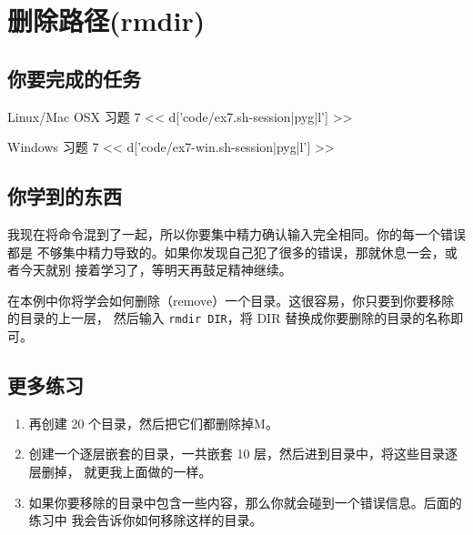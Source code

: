 \chapter{删除路径(rmdir)}

\section{你要完成的任务}

\begin{code}{Linux/Mac OSX 习题 7}
<< d['code/ex7.sh-session|pyg|l'] >>
\end{code}

\begin{code}{Windows 习题 7}
<< d['code/ex7-win.sh-session|pyg|l'] >>
\end{code}


\section{你学到的东西}

我现在将命令混到了一起，所以你要集中精力确认输入完全相同。你的每一个错误都是
不够集中精力导致的。如果你发现自己犯了很多的错误，那就休息一会，或者今天就别
接着学习了，等明天再鼓足精神继续。

在本例中你将学会如何删除（remove）一个目录。这很容易，你只要到你要移除的目录的上一层，
然后输入 \verb|rmdir DIR|，将 DIR 替换成你要删除的目录的名称即可。

\section{更多练习}

\begin{enumerate}
\item 再创建 20 个目录，然后把它们都删除掉M。
\item 创建一个逐层嵌套的目录，一共嵌套 10 层，然后进到目录中，将这些目录逐层删掉，
    就更我上面做的一样。
\item 如果你要移除的目录中包含一些内容，那么你就会碰到一个错误信息。后面的练习中
    我会告诉你如何移除这样的目录。
\end{enumerate}

